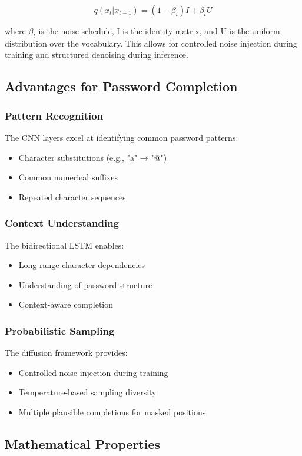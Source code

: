 $$q(x_t|x_{t-1}) = (1-\beta_t)I + \beta_t U$$

where $\beta_t$ is the noise schedule, I is the identity matrix, and U is the uniform distribution over the vocabulary. This allows for controlled noise injection during training and structured denoising during inference.

\subsection{Advantages for Password Completion}

\subsubsection{Pattern Recognition}
The CNN layers excel at identifying common password patterns:
\begin{itemize}
    \item Character substitutions (e.g., "a" → "@")
    \item Common numerical suffixes
    \item Repeated character sequences
\end{itemize}

\subsubsection{Context Understanding}
The bidirectional LSTM enables:
\begin{itemize}
    \item Long-range character dependencies
    \item Understanding of password structure
    \item Context-aware completion
\end{itemize}

\subsubsection{Probabilistic Sampling}
The diffusion framework provides:
\begin{itemize}
    \item Controlled noise injection during training
    \item Temperature-based sampling diversity
    \item Multiple plausible completions for masked positions
\end{itemize}

\subsection{Mathematical Properties}

